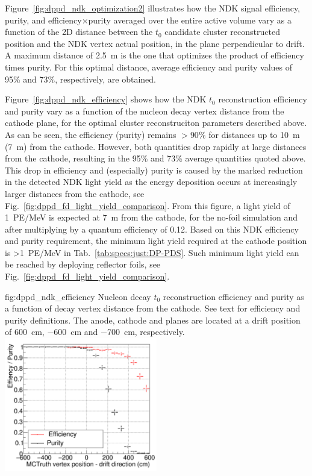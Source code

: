 Figure~\ref{fig:dppd_ndk_optimization2} illustrates how the NDK signal efficiency, purity, and efficiency$\times$purity averaged over the entire  active volume vary as a function of the 2D distance between the $t_0$ candidate cluster reconstructed position and the NDK vertex actual position, in the plane perpendicular to drift. A maximum distance of \SI{2.5}{\m} is the one that optimizes the product of efficiency times purity. For this optimal distance, average efficiency and purity values of \num{95}\% and \num{73}\%, respectively, are obtained.  

Figure~\ref{fig:dppd_ndk_efficiency} shows how the NDK $t_0$ reconstruction efficiency and purity vary as a function of the nucleon decay vertex distance from the cathode plane, for the optimal cluster reconstruciton parameters described above. As can be seen, the efficiency (purity) remains $>90\%$ for distances up to \SI{10}{\m} (\SI{7}{\m}) from the cathode. However, both quantities drop rapidly at large distances from the cathode, resulting in the 95\% and 73\% average quantities quoted above. This drop in efficiency and (especially) purity is caused by the marked reduction in the detected NDK light yield as the energy deposition occurs at increasingly larger distances from the cathode, see Fig.~\ref{fig:dppd_fd_light_yield_comparison}. From this figure, a light yield of \SI{1}{PE/\MeV} is expected at \SI{7}{\m} from the cathode, for the no-foil simulation and after multiplying by a quantum efficiency of \num{0.12}. Based on this NDK efficiency and purity requirement, the minimum light yield required at the cathode position is \SI{>1}{PE/\MeV} in Tab.~\ref{tab:specs:just:DP-PDS}. Such minimum light yield can be reached by deploying  reflector foils, see Fig.~\ref{fig:dppd_fd_light_yield_comparison}.

\begin{dunefigure}{fig:dppd_ndk_efficiency}
     {Nucleon decay $t_0$ reconstruction efficiency and purity as a function of decay vertex distance from the cathode. See text for efficiency and purity definitions. The anode, cathode  and  planes are located at a drift position of \SI{+600}{\cm}, \SI{-600}{\cm} and \SI{-700}{\cm}, respectively.}
    \includegraphics[width=0.5\textwidth]{graphics/dppd_ndk_efficiency.pdf}
    \end{dunefigure}

